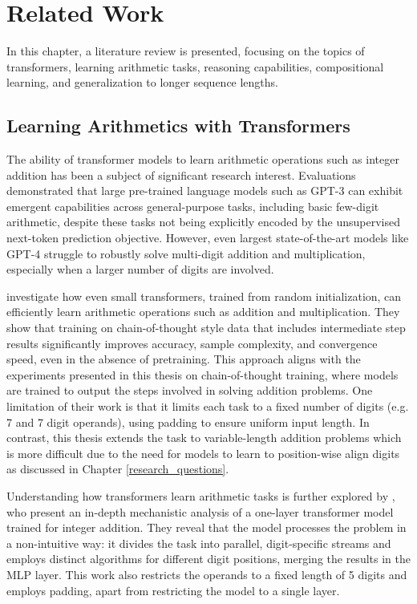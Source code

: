 \chapter{Related Work}\label{related_work}

In this chapter, a literature review is presented, focusing on the topics of transformers, learning arithmetic tasks, reasoning capabilities, compositional learning, and generalization to longer sequence lengths.


\section{Learning Arithmetics with Transformers}\label{sec:sota_arithmetic_tasks}

The ability of transformer models \parencite{vaswani_attention_2017} to learn arithmetic operations such as integer addition has been a subject of significant research interest. Evaluations demonstrated that large pre-trained language models such as GPT-3 \parencite{brown_language_2020} can exhibit emergent capabilities across general-purpose tasks, including basic few-digit arithmetic, despite these tasks not being explicitly encoded by the unsupervised next-token prediction objective. However, even largest state-of-the-art models like GPT-4 \parencite{achiam_gpt-4_2023} struggle to robustly solve multi-digit addition and multiplication, especially when a larger number of digits are involved.

\cite{lee_teaching_2023} investigate how even small transformers, trained from random initialization, can efficiently learn arithmetic operations such as addition and multiplication. They show that training on chain-of-thought style data that includes intermediate step results significantly improves accuracy, sample complexity, and convergence speed, even in the absence of pretraining. This approach aligns with the experiments presented in this thesis on chain-of-thought training, where models are trained to output the steps involved in solving addition problems. One limitation of their work is that it limits each task to a fixed number of digits (e.g. 7 and 7 digit operands), using padding to ensure uniform input length. In contrast, this thesis extends the task to variable-length addition problems which is more difficult due to the need for models to learn to position-wise align digits as discussed in Chapter \ref{research_questions}.

Understanding how transformers learn arithmetic tasks is further explored by \cite{quirke_understanding_2023}, who present an in-depth mechanistic analysis of a one-layer transformer model trained for integer addition. They reveal that the model processes the problem in a non-intuitive way: it divides the task into parallel, digit-specific streams and employs distinct algorithms for different digit positions, merging the results in the MLP layer. This work also restricts the operands to a fixed length of 5 digits and employs padding, apart from restricting the model to a single layer.


